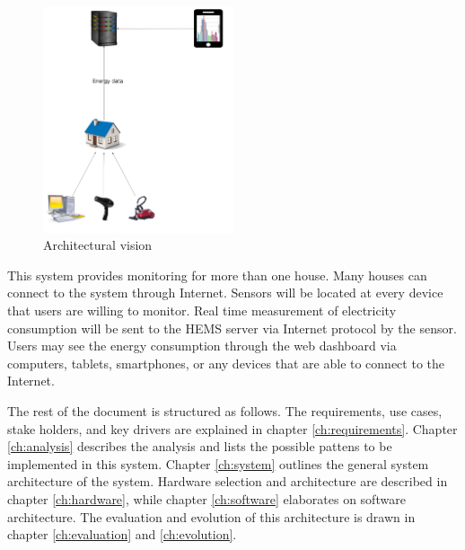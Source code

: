 \begin{figure}[H]
	\centering
	\includegraphics[width=0.5\textwidth]{1-context/images/vision.jpg}
	\caption{Architectural vision}
	\label{fig:vision}
\end{figure}

This system provides monitoring for more than one house. Many houses can connect to the system through Internet. Sensors will be located at every device that users are willing to monitor. Real time measurement of electricity consumption will be sent to the HEMS server via Internet protocol by the sensor. Users may see the energy consumption through the web dashboard via computers, tablets, smartphones, or any devices that are able to connect to the Internet.



The rest of the document is structured as follows. The requirements, use cases, stake holders, and key drivers are explained in chapter \ref{ch:requirements}. Chapter \ref{ch:analysis} describes the analysis and lists the possible pattens to be implemented in this system. Chapter \ref{ch:system} outlines the general system architecture of the system. Hardware selection and architecture are described in chapter \ref{ch:hardware}, while chapter \ref{ch:software} elaborates on software architecture. The evaluation and evolution of this architecture is drawn in chapter \ref{ch:evaluation} and \ref{ch:evolution}. 